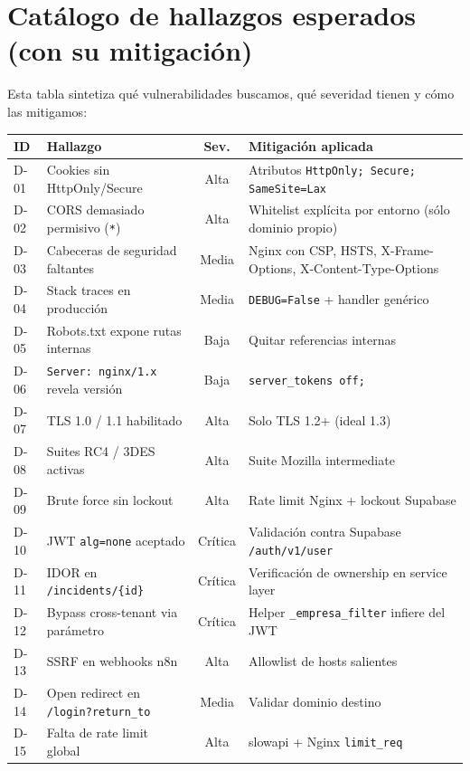 \documentclass[12pt,a4paper,oneside]{article}
\begin{document}
\section{Catálogo de hallazgos esperados (con su mitigación)}

Esta tabla sintetiza qué vulnerabilidades buscamos, qué severidad tienen y cómo las mitigamos:

\begin{longtable}{p{1cm}p{4.5cm}cp{6.5cm}}
\toprule
\textbf{ID} & \textbf{Hallazgo} & \textbf{Sev.} & \textbf{Mitigación aplicada} \\
\midrule
\endhead
D-01 & Cookies sin HttpOnly/Secure & Alta & Atributos \texttt{HttpOnly; Secure; SameSite=Lax} \\
D-02 & CORS demasiado permisivo (\texttt{*}) & Alta & Whitelist explícita por entorno (sólo dominio propio) \\
D-03 & Cabeceras de seguridad faltantes & Media & Nginx con CSP, HSTS, X-Frame-Options, X-Content-Type-Options \\
D-04 & Stack traces en producción & Media & \texttt{DEBUG=False} + handler genérico \\
D-05 & Robots.txt expone rutas internas & Baja & Quitar referencias internas \\
D-06 & \texttt{Server: nginx/1.x} revela versión & Baja & \texttt{server\_tokens off;} \\
D-07 & TLS 1.0 / 1.1 habilitado & Alta & Solo TLS 1.2+ (ideal 1.3) \\
D-08 & Suites RC4 / 3DES activas & Alta & Suite Mozilla intermediate \\
D-09 & Brute force sin lockout & Alta & Rate limit Nginx + lockout Supabase \\
D-10 & JWT \texttt{alg=none} aceptado & Crítica & Validación contra Supabase \texttt{/auth/v1/user} \\
D-11 & IDOR en \texttt{/incidents/\{id\}} & Crítica & Verificación de ownership en service layer \\
D-12 & Bypass cross-tenant via parámetro & Crítica & Helper \texttt{\_empresa\_filter} infiere del JWT \\
D-13 & SSRF en webhooks n8n & Alta & Allowlist de hosts salientes \\
D-14 & Open redirect en \texttt{/login?return\_to} & Media & Validar dominio destino \\
D-15 & Falta de rate limit global & Alta & slowapi + Nginx \texttt{limit\_req} \\
\bottomrule
\end{longtable}
\end{document}
